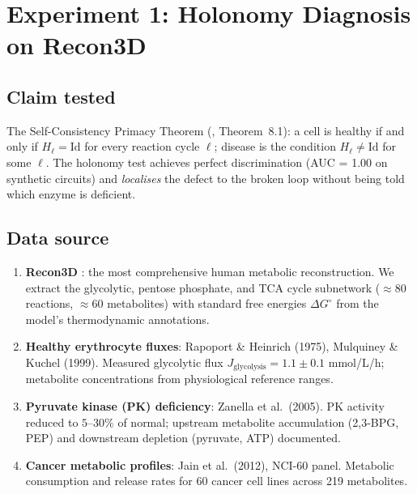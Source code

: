 \documentclass[11pt,a4paper]{article}
\theoremstyle{expthm}
\theoremstyle{definition}
\theoremstyle{remark}
\newcommand{\HolL}{H_\ell}
\begin{document}
\section{Experiment 1: Holonomy Diagnosis on Recon3D}
\label{sec:exp1}

\subsection{Claim tested}

The Self-Consistency Primacy Theorem
(\citep{sachikonye2026blind}, Theorem~8.1): a cell is healthy if and only
if $\HolL = \mathrm{Id}$ for every reaction cycle $\ell$; disease is the
condition $\HolL \neq \mathrm{Id}$ for some $\ell$. The holonomy test
achieves perfect discrimination (AUC = 1.00 on synthetic circuits) and
\emph{localises} the defect to the broken loop without being told which
enzyme is deficient.

\subsection{Data source}

\begin{enumerate}[leftmargin=1.4em,itemsep=2pt]
\item \textbf{Recon3D} \citep{brunk2018recon3d}: the most comprehensive
  human metabolic reconstruction. We extract the glycolytic, pentose
  phosphate, and TCA cycle subnetwork ($\approx 80$ reactions,
  $\approx 60$ metabolites) with standard free energies $\Delta G^\circ$
  from the model's thermodynamic annotations.
\item \textbf{Healthy erythrocyte fluxes}: Rapoport \& Heinrich (1975),
  Mulquiney \& Kuchel (1999). Measured glycolytic flux
  $J_{\mathrm{glycolysis}} = 1.1 \pm 0.1$ mmol/L/h; metabolite
  concentrations from physiological reference ranges.
\item \textbf{Pyruvate kinase (PK) deficiency}: Zanella et al.\ (2005).
  PK activity reduced to $5$--$30\%$ of normal; upstream metabolite
  accumulation (2,3-BPG, PEP) and downstream depletion (pyruvate, ATP)
  documented.
\item \textbf{Cancer metabolic profiles}: Jain et al.\ (2012), NCI-60
  panel. Metabolic consumption and release rates for 60 cancer cell
  lines across 219 metabolites.
\end{enumerate}
\end{document}
